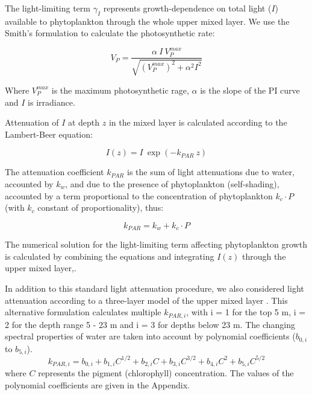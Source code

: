 \documentclass[journal abbreviation, manuscript]{copernicus}
\begin{document}
The light-limiting term $\gamma_{I}$ represents growth-dependence on total light ($I$) available to phytoplankton through the whole upper mixed layer. We use the Smith's formulation to calculate the photosynthetic rate:

\begin{equation}
    V_P = \frac{\alpha ~ I ~ V_P^{max}}{\sqrt{(V_P^{max})^2 + \alpha^2 I^2}}
\end{equation}

Where $V_P^{max}$ is the maximum photosynthetic rage, $\alpha$ is the slope of the PI curve and $I$ is irradiance.

Attenuation of $I$ at depth $z$ in the mixed layer is calculated according to the Lambert-Beer equation:

\begin{equation}
    I(z) = I \ \exp{(-k_{PAR} \ z)}
\end{equation}

The attenuation coefficient $k_{PAR}$ is the sum of light attenuations due to water, accounted by $k_w$, and due to the presence of phytoplankton (self-shading), accounted by a term proportional to the concentration of phytoplankton $k_c \cdot P$ (with $k_c$ constant of proportionality), thus:

\begin{equation}
    k_{PAR} = k_w + k_c \cdot P
\end{equation}

The numerical solution for the light-limiting term affecting phytoplankton growth is calculated by combining the equations and integrating $I(z)$ through the upper mixed layer,.

In addition to this standard light attenuation procedure, we also considered light attenuation according to a three-layer model of the upper mixed layer  \citep{Anderson1993APhotosynthesis}. This alternative formulation calculates multiple $k_{PAR, i}$, with i = 1 for the top 5 \unit{m}, i = 2 for the depth range 5 - 23 \unit{m} and i = 3 for depths below 23 \unit{m}. The changing spectral properties of water are taken into account by polynomial coefficients ($b_{0,i}$ to $b_{5,i}$).
\begin{equation}
    k_{PAR, i} = b_{0,i} + b_{1,i} C^{1/2} + b_{2,i} C + b_{3,i} C^{3/2} + b_{4,i} C^2 + b_{5,i} C^{5/2}
\end{equation}
where $C$ represents the pigment (chlorophyll) concentration. The values of the polynomial coefficients are given in the Appendix.
\end{document}
